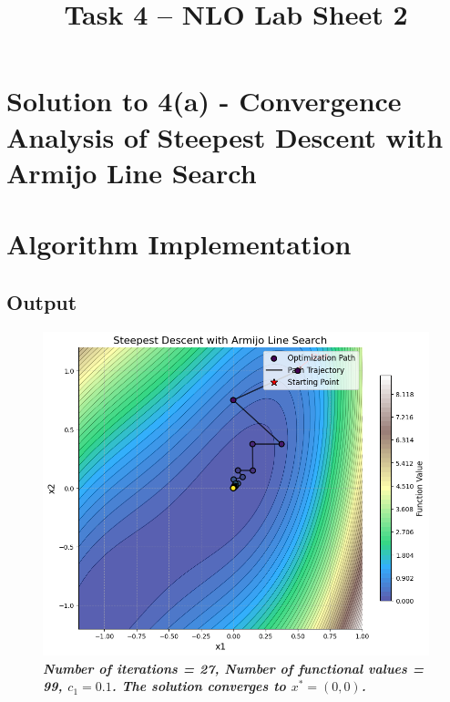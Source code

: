 \documentclass{article}
\begin{document}
\title{Task 4 -- NLO Lab Sheet 2}

\maketitle




\section*{Solution to 4(a) - Convergence Analysis of Steepest Descent with Armijo Line Search}



\section{Algorithm Implementation}

\subsection{Output}

\begin{figure}[H]
    \centering
    \includegraphics[width=1\textwidth]{Lab2_1.png}
    \caption{\textbf{\textit{Number of iterations = 27, Number of functional values = 99, $c_1 = 0.1$. The solution converges to $x^* = (0,0)$.}}}
    \label{lab21}
\end{figure}
\end{document}
